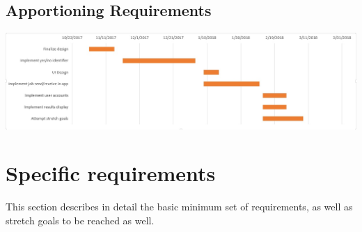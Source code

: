 \documentclass[onecolumn, draftclsnofoot,10pt, compsoc]{IEEEtran}
\begin{document}
\subsection{Apportioning Requirements}
\includegraphics[scale=0.65]{gantt_chart.jpg}

\section{Specific requirements}
This section describes in detail the basic minimum set of requirements, as well as stretch goals to be reached as well. 
\end{document}
